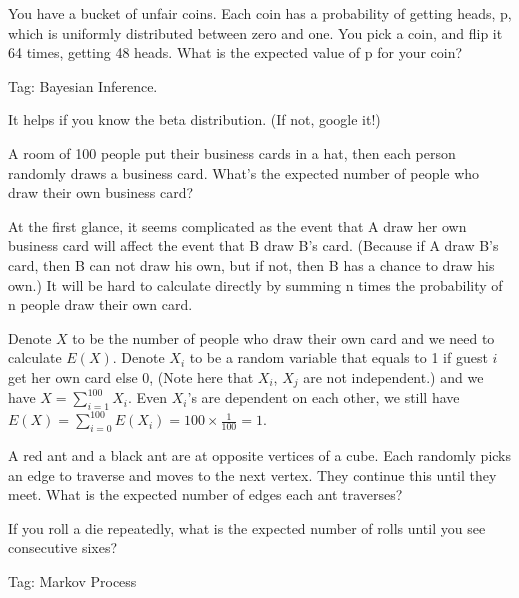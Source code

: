 \begin{exe}
You have a bucket of unfair coins. Each coin has a probability of getting heads, p, which is uniformly distributed between zero and one. You pick a coin, and flip it 64 times, getting 48 heads. What is the expected value of p for your coin?
\end{exe}
Tag: Bayesian Inference.
\begin{teacher}
\begin{sol}
It helps if you know the beta distribution. (If not, google it!)
\end{sol}
\end{teacher}

\begin{exe}
A room of 100 people put their business cards in a hat, then each person randomly draws a business card. What's the expected number of people who draw their own business card?
\end{exe}
\begin{teacher}
\begin{sol}
At the first glance, it seems complicated as the event that A draw her own business card will affect the event that B draw B's card. (Because if A draw B's card, then B can not draw his own, but if not, then B has a chance to draw his own.) It will be hard to calculate directly by summing n times the probability of n people draw their own card.

Denote $X$ to be the number of people who draw their own card and we need to calculate $E(X)$. Denote $X_i$ to be a random variable that equals to 1 if guest $i$ get her own card else 0, (Note here that $X_i$, $X_j$ are not independent.) and we have $X=\sum_{i=1}^{100}X_i$. Even $X_i$'s are dependent on each other, we still have $E(X) = \sum_{i=0}^{100} E(X_i)= 100\times \frac{1}{100}=1$.
\end{sol}
\end{teacher}

\begin{exe}
A red ant and a black ant are at opposite vertices of a cube. Each randomly picks an edge to traverse and moves to the next vertex. They continue this until they meet. What is the expected number of edges each ant traverses?
\end{exe}
\begin{teacher}
\begin{sol}
\end{sol}
\end{teacher}

\begin{exe}
If you roll a die repeatedly, what is the expected number of rolls until you see consecutive sixes?
\end{exe}
\begin{teacher}
Tag: Markov Process
\begin{sol}
\end{sol}
\end{teacher}

